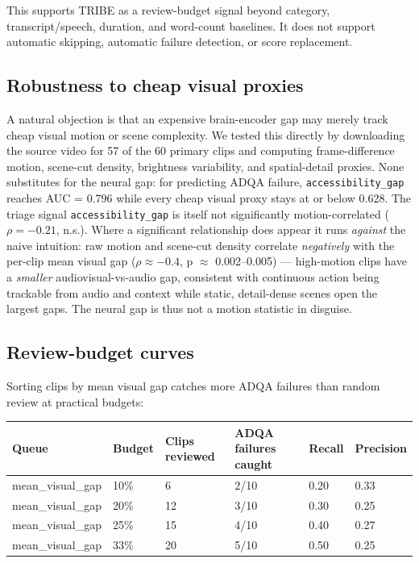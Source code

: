\documentclass[10pt,twocolumn]{article}
\begin{document}
This supports TRIBE as a review-budget signal beyond category, transcript/speech, duration, and word-count baselines. It does not support automatic skipping, automatic failure detection, or score replacement.

\subsection{Robustness to cheap visual proxies}

A natural objection is that an expensive brain-encoder gap may merely track cheap visual motion or scene complexity. We tested this directly by downloading the source video for 57 of the 60 primary clips and computing frame-difference motion, scene-cut density, brightness variability, and spatial-detail proxies. None substitutes for the neural gap: for predicting ADQA failure, \texttt{accessibility\_gap} reaches AUC = 0.796 while every cheap visual proxy stays at or below 0.628. The triage signal \texttt{accessibility\_gap} is itself not significantly motion-correlated ($\rho = -0.21$, n.s.). Where a significant relationship does appear it runs \emph{against} the naive intuition: raw motion and scene-cut density correlate \emph{negatively} with the per-clip mean visual gap ($\rho \approx -0.4$, p $\approx$ 0.002--0.005) --- high-motion clips have a \emph{smaller} audiovisual-vs-audio gap, consistent with continuous action being trackable from audio and context while static, detail-dense scenes open the largest gaps. The neural gap is thus not a motion statistic in disguise.


\subsection{Review-budget curves}

Sorting clips by mean visual gap catches more ADQA failures than random review at practical budgets:


\begin{table}[t]
\centering
\scriptsize
\begin{tabular}{@{}llllll@{}}
\toprule
Queue & Budget & Clips reviewed & ADQA failures caught & Recall & Precision \\
\midrule
mean\_visual\_gap & 10\% & 6 & 2/10 & 0.20 & 0.33 \\
mean\_visual\_gap & 20\% & 12 & 3/10 & 0.30 & 0.25 \\
mean\_visual\_gap & 25\% & 15 & 4/10 & 0.40 & 0.27 \\
mean\_visual\_gap & 33\% & 20 & 5/10 & 0.50 & 0.25 \\
\bottomrule
\end{tabular}
\end{table}
\end{document}
